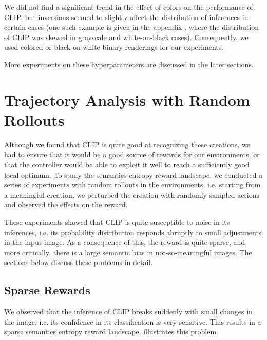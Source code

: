 We did not find a significant trend in the effect of colors on the performance of CLIP, but inversions seemed to slightly affect the distribution of inferences in certain cases
(one such example is given in the appendix , where the distribution of CLIP was skewed in grayscale and white-on-black cases).
Consequently, we used colored or black-on-white binary renderings for our experiments.

More experiments on these hyperparameters are discussed in the later sections.


\section{Trajectory Analysis with Random Rollouts}
\label{sec:clip-problems}
Although we found that CLIP is quite good at recognizing these creations, we had to ensure that it would be a good source of rewards for our environments, or that the controller would be able to exploit it well to reach a sufficiently good local optimum.
To study the semantics entropy reward landscape, we conducted a series of experiments with random rollouts in the environments, i.e. starting from a meaningful creation, we perturbed the creation with randomly sampled actions and observed the effects on the reward.

These experiments showed that CLIP is quite susceptible to noise in its inferences, i.e. its probability distribution responds abruptly to small adjustments in the input image.
As a consequence of this, the reward is quite sparse, and more critically, there is a large semantic bias in not-so-meaningful images.
The sections below discuss these problems in detail.

\subsection{Sparse Rewards} %
\label{sec:sparse-rewards}

We observed that the inference of CLIP breaks suddenly with small changes in the image, i.e. its confidence in its classification is very sensitive.
This results in a sparse semantics entropy reward landscape.
 illustrates this problem.

